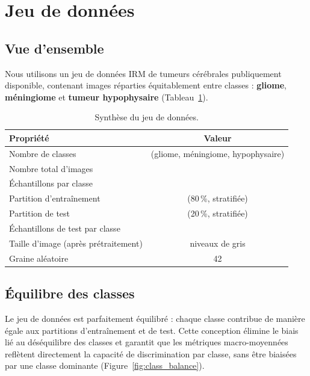 \section{Jeu de données}

\subsection{Vue d'ensemble}

Nous utilisons un jeu de données IRM de tumeurs cérébrales publiquement disponible,
contenant \NTotal{} images réparties équitablement entre \NClasses{} classes :
\textbf{gliome}, \textbf{méningiome} et \textbf{tumeur hypophysaire}
(Tableau~\ref{tab:dataset}).

\begin{table}[H]
  \centering
  \caption{Synthèse du jeu de données.}
  \label{tab:dataset}
  \begin{tabular}{@{}lc@{}}
    \toprule
    \textbf{Propriété} & \textbf{Valeur} \\
    \midrule
    Nombre de classes & \NClasses{} (gliome, méningiome, hypophysaire) \\
    Nombre total d'images & \NTotal{} \\
    Échantillons par classe & \NPerClass{} \\
    Partition d'entraînement & \NTrain{} (80\,\%, stratifiée) \\
    Partition de test & \NTest{} (20\,\%, stratifiée) \\
    Échantillons de test par classe & \NTestPerClass{} \\
    Taille d'image (après prétraitement) & \ImgSize{} niveaux de gris \\
    Graine aléatoire & 42 \\
    \bottomrule
  \end{tabular}
\end{table}

\subsection{Équilibre des classes}

Le jeu de données est parfaitement équilibré : chaque classe contribue de manière
égale aux partitions d'entraînement et de test. Cette conception élimine le biais
lié au déséquilibre des classes et garantit que les métriques macro-moyennées
reflètent directement la capacité de discrimination par classe, sans être biaisées
par une classe dominante (Figure~\ref{fig:class_balance}).

